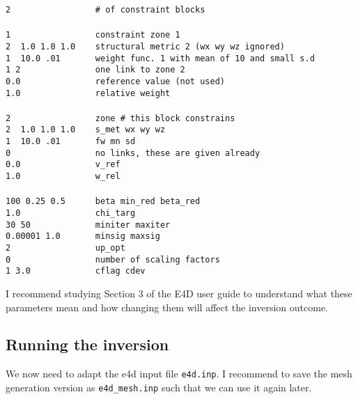\documentclass[11pt]{article}
\begin{document}
\verb+2                 # of constraint blocks+ \\
\verb++\\
\verb+1                 constraint zone 1     + \\            
\verb+2  1.0 1.0 1.0    structural metric 2 (wx wy wz ignored) + \\
\verb+1  10.0 .01       weight func. 1 with mean of 10 and small s.d+ \\
\verb+1 2               one link to zone 2+ \\
\verb+0.0               reference value (not used)+ \\
\verb+1.0               relative weight+ \\
\verb++\\
\verb+2                 zone # this block constrains  + \\            
\verb+2  1.0 1.0 1.0    s_met wx wy wz + \\
\verb+1  10.0 .01       fw mn sd     + \\
\verb+0                 no links, these are given already + \\
\verb+0.0               v_ref+ \\
\verb+1.0               w_rel+ \\
\verb++ \\
\verb+100 0.25 0.5      beta min_red beta_red+ \\
\verb+1.0               chi_targ+ \\
\verb+30 50             miniter maxiter+ \\
\verb+0.00001 1.0       minsig maxsig+ \\
\verb+2                 up_opt+ \\
\verb+0                 number of scaling factors+\\
\verb+1 3.0             cflag cdev+


\vspace{1cm}
I recommend studying Section 3 of the E4D user guide to understand
what these parameters mean and how changing them will affect the
inversion outcome. 

\subsection{Running the inversion}

We now need to adapt the e4d input file \verb+e4d.inp+. I recommend to
save the mesh generation version as \verb+e4d_mesh.inp+ such that we
can use it again later.
\end{document}
